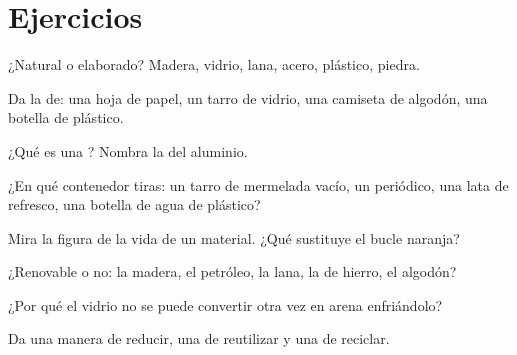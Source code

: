 \section{Ejercicios}

\begin{exercise}[$\star$]\label{exo:g5:raw-materials-and-recycling:1}
¿Natural o elaborado? Madera, vidrio, lana, acero, plástico, piedra.
\end{exercise}

\begin{exercise}[$\star$]\label{exo:g5:raw-materials-and-recycling:2}
Da la  de: una hoja de papel, un tarro de vidrio, una
camiseta de algodón, una botella de plástico.
\end{exercise}

\begin{exercise}[$\star$]\label{exo:g5:raw-materials-and-recycling:3}
¿Qué es una ? Nombra la  del aluminio.
\end{exercise}

\begin{exercise}[$\star$]\label{exo:g5:raw-materials-and-recycling:4}
¿En qué contenedor tiras: un tarro de mermelada vacío, un periódico, una
lata de refresco, una botella de agua de plástico?
\end{exercise}

\begin{exercise}[$\star$]\label{exo:g5:raw-materials-and-recycling:5}
Mira la figura de la vida de un material. ¿Qué sustituye el bucle
naranja?
\end{exercise}

\begin{exercise}[$\star$]\label{exo:g5:raw-materials-and-recycling:6}
¿Renovable o no: la madera, el petróleo, la lana, la  de hierro, el
algodón?
\end{exercise}

\begin{exercise}[$\star$]\label{exo:g5:raw-materials-and-recycling:7}
¿Por qué el vidrio no se puede convertir otra vez en arena enfriándolo?
\end{exercise}

\begin{exercise}[$\star$]\label{exo:g5:raw-materials-and-recycling:8}
Da una manera de reducir, una de reutilizar y una de reciclar.
\end{exercise}

